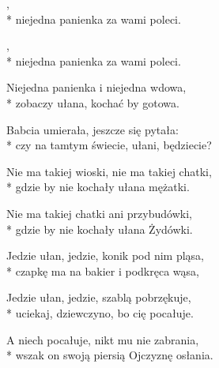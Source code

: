 \begin{lyrics}[longestline={Nie ma takiej wioski, nie ma takiej chatki,}]

,\\*
niejedna panienka za wami poleci.

\begin{chorus}
,\\*
niejedna panienka za wami poleci.
\end{chorus}

Niejedna panienka i niejedna wdowa,\\*
zobaczy ułana, kochać by gotowa.

\chorusref

Babcia umierała, jeszcze się pytała:\\*
czy na tamtym świecie, ułani, będziecie?

\chorusref

Nie ma takiej wioski, nie ma takiej chatki,\\*
gdzie by nie kochały ułana mężatki.

\chorusref

Nie ma takiej chatki ani przybudówki,\\*
gdzie by nie kochały ułana Żydówki.

\chorusref

Jedzie ułan, jedzie, konik pod nim pląsa,\\*
czapkę ma na bakier i podkręca wąsa,

\chorusref

Jedzie ułan, jedzie, szablą pobrzękuje,\\*
uciekaj, dziewczyno, bo cię pocałuje.

\chorusref

A niech pocałuje, nikt mu nie zabrania,\\*
wszak on swoją piersią Ojczyznę osłania.

\chorusref
\end{lyrics}




